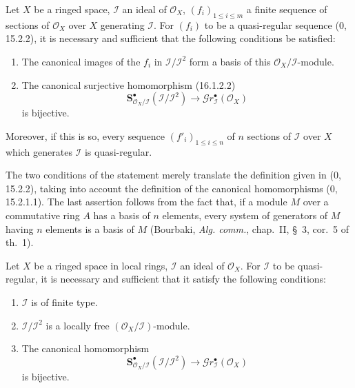 \begin{proposition}[16.9.3]
\label{IV.16.9.3}
Let $X$ be a ringed space, $\mathscr{I}$ an ideal of $\mathcal{O}_X$,
$(f_i)_{1\leq i\leq m}$ a finite sequence of sections of $\mathcal{O}_X$
over $X$ generating $\mathscr{I}$. For $(f_i)$ to be a quasi-regular
sequence (0, 15.2.2), it is necessary and sufficient that the following
conditions be satisfied:
\begin{enumerate}
  \item[(i)] The canonical images of the $f_i$ in
  $\mathscr{I}/\mathscr{I}^2$ form a basis of this
  $\mathcal{O}_X/\mathscr{I}$-module.
  \item[(ii)] The canonical surjective homomorphism (16.1.2.2)
  \[
    \mathbf{S}_{\mathcal{O}_X/\mathscr{I}}^{\bullet}
    (\mathscr{I}/\mathscr{I}^2)
    \longrightarrow\mathscr{G}r_{\mathscr{I}}^{\bullet}(\mathcal{O}_X)
  \]
  is bijective.
\end{enumerate}
Moreover, if this is so, every sequence $(f'_i)_{1\leq i\leq n}$ of $n$
sections of $\mathscr{I}$ over $X$ which generates $\mathscr{I}$ is
quasi-regular.
\end{proposition}


The two conditions of the statement merely translate the definition given in
(0, 15.2.2), taking into account the definition of the canonical
homomorphisms (0, 15.2.1.1). The last assertion follows from the fact that,
if a module $M$ over a commutative ring $A$ has a basis of $n$ elements,
every system of generators of $M$ having $n$ elements is a basis of $M$
(Bourbaki, \emph{Alg. comm.}, chap.~II, §~3, cor.~5 of th.~1).

\begin{corollary}[16.9.4]
\label{IV.16.9.4}
Let $X$ be a ringed space in local rings, $\mathscr{I}$ an ideal of
$\mathcal{O}_X$. For $\mathscr{I}$ to be quasi-regular, it is necessary and
sufficient that it satisfy the following conditions:
\begin{enumerate}
  \item[(i)] $\mathscr{I}$ is of finite type.
  \item[(ii)] $\mathscr{I}/\mathscr{I}^2$ is a locally free
  $(\mathcal{O}_X/\mathscr{I})$-module.
  \item[(iii)] The canonical homomorphism
  \[
    \mathbf{S}_{\mathcal{O}_X/\mathscr{I}}^{\bullet}
    (\mathscr{I}/\mathscr{I}^2)
    \longrightarrow\mathscr{G}r_{\mathscr{I}}^{\bullet}(\mathcal{O}_X)
    \tag{16.9.4.1}
    \label{IV.16.9.4.1}
  \]
  is bijective.
\end{enumerate}
\end{corollary}

